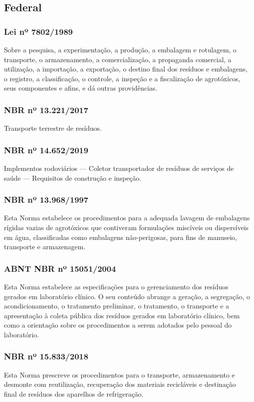 \begin{subapend}
	\subsection{Federal}
	\begin{subsubapend}
		\item \subsubsection{Lei nº 7802/1989}
		Sobre a pesquisa, a experimentação, a produção, a embalagem e rotulagem, o transporte, o armazenamento, a comercialização, a propaganda comercial, a utilização, a importação, a exportação, o destino final dos resíduos e embalagens, o registro, a classificação, o controle, a inspeção e a fiscalização de agrotóxicos, seus componentes e afins, e dá outras providências.
		\subsubsection{NBR nº 13.221/2017}
		Transporte terrestre de resíduos.
		\subsubsection{NBR nº 14.652/2019}
		Implementos rodoviários — Coletor transportador de resíduos de serviços de saúde — Requisitos de construção e inspeção.
		\subsubsection{NBR nº 13.968/1997}
		Esta Norma estabelece os procedimentos para a adequada lavagem de embalagens rígidas vazias de agrotóxicos que contiveram formulações miscíveis ou dispersíveis em água, classificadas como embalagens não-perigosas, para fins de manuseio, transporte e armazenagem.
		\subsubsection{ABNT NBR nº 15051/2004}
		Esta Norma estabelece as especificações para o gerenciamento dos resíduos gerados em laboratório clínico. O seu conteúdo abrange a geração, a segregação, o acondicionamento, o tratamento preliminar, o tratamento, o transporte e a apresentação à coleta pública dos resíduos gerados em laboratório clínico, bem como a orientação sobre os procedimentos a serem adotados pelo pessoal do laboratório.
		\subsubsection{NBR nº 15.833/2018}
		Esta Norma prescreve os procedimentos para o transporte, armazenamento e desmonte com reutilização, recuperação dos materiais recicláveis e destinação final de resíduos dos aparelhos de refrigeração.

\end{subsubapend}
\end{subapend}
